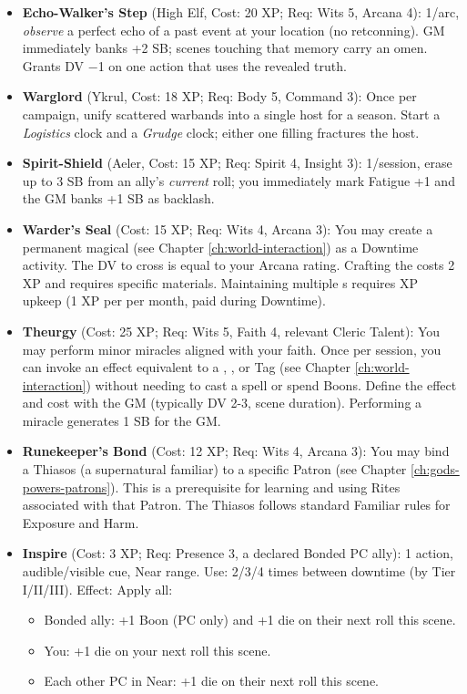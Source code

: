 \begin{itemize}
    \item \textbf{Echo-Walker's Step} (High Elf, Cost: 20 XP; Req: Wits 5, Arcana 4): 
1/arc, \emph{observe} a perfect echo of a past event at your location (no retconning). 
GM immediately banks +2 SB; scenes touching that memory carry an omen. Grants DV −1 on one action that uses the revealed truth.
    \item \textbf{Warglord} (Ykrul, Cost: 18 XP; Req: Body 5, Command 3): 
Once per campaign, unify scattered warbands into a single host for a season. Start a \emph{Logistics} clock and a \emph{Grudge} clock; either one filling fractures the host.
    \item \textbf{Spirit-Shield} (Aeler, Cost: 15 XP; Req: Spirit 4, Insight 3): 
1/session, erase up to 3 SB from an ally's \emph{current} roll; you immediately mark Fatigue +1 and the GM banks +1 SB as backlash.
    \item \textbf{Warder's Seal} (Cost: 15 XP; Req: Wits 4, Arcana 3): You may create a permanent magical  (see Chapter \ref{ch:world-interaction}) as a Downtime activity. The DV to cross is equal to your Arcana rating. Crafting the  costs 2 XP and requires specific materials. Maintaining multiple s requires XP upkeep (1 XP per  per month, paid during Downtime).
    \item \textbf{Theurgy} (Cost: 25 XP; Req: Wits 5, Faith 4, relevant Cleric Talent): You may perform minor miracles aligned with your faith. Once per session, you can invoke an effect equivalent to a , , or  Tag (see Chapter \ref{ch:world-interaction}) without needing to cast a spell or spend Boons. Define the effect and cost with the GM (typically DV 2-3, scene duration). Performing a miracle generates 1 SB for the GM.
    \item \textbf{Runekeeper's Bond} (Cost: 12 XP; Req: Wits 4, Arcana 3): You may bind a Thiasos (a supernatural familiar) to a specific Patron (see Chapter \ref{ch:gods-powers-patrons}). This is a prerequisite for learning and using Rites associated with that Patron. The Thiasos follows standard Familiar rules for Exposure and Harm.
    \item \textbf{Inspire} (Cost: 3 XP; Req: Presence 3, a declared Bonded PC ally): 
1 action, audible/visible cue, Near range. Use: 2/3/4 times between downtime (by Tier I/II/III). Effect: Apply all:
\begin{itemize}
    \item Bonded ally: +1 Boon (PC only) and +1 die on their next roll this scene.
    \item You: +1 die on your next roll this scene.
    \item Each other PC in Near: +1 die on their next roll this scene.
\end{itemize}
\end{itemize}

